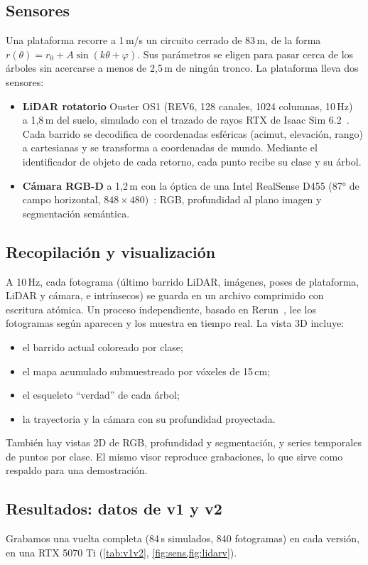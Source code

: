 \documentclass[11pt,a4paper]{article}
\begin{document}
\subsection{Sensores}
Una plataforma recorre a 1\,m/s un circuito cerrado de 83\,m, de la forma $r(\theta) = r_0 + A\sin(k\theta+\varphi)$. Sus parámetros se eligen para pasar cerca de los árboles sin acercarse a menos de 2,5\,m de ningún tronco. La plataforma lleva dos sensores:
\begin{itemize}
  \item \textbf{LiDAR rotatorio} Ouster OS1 (REV6, 128 canales, 1024 columnas, 10\,Hz)~\cite{ousteros1} a 1,8\,m del suelo, simulado con el trazado de rayos RTX de Isaac Sim 6.2~\cite{isaacsim}. Cada barrido se decodifica de coordenadas esféricas (acimut, elevación, rango) a cartesianas y se transforma a coordenadas de mundo. Mediante el identificador de objeto de cada retorno, cada punto recibe su clase y su árbol.
  \item \textbf{Cámara RGB-D} a 1,2\,m con la óptica de una Intel RealSense D455 (87° de campo horizontal, $848\times480$)~\cite{realsensed455}: RGB, profundidad al plano imagen y segmentación semántica.
\end{itemize}

\subsection{Recopilación y visualización}
A 10\,Hz, cada fotograma (último barrido LiDAR, imágenes, poses de plataforma, LiDAR y cámara, e intrínsecos) se guarda en un archivo comprimido con escritura atómica. Un proceso independiente, basado en Rerun~\cite{rerun}, lee los fotogramas según aparecen y los muestra en tiempo real. La vista 3D incluye:
\begin{itemize}
  \item el barrido actual coloreado por clase;
  \item el mapa acumulado submuestreado por vóxeles de 15\,cm;
  \item el esqueleto \enquote{verdad} de cada árbol;
  \item la trayectoria y la cámara con su profundidad proyectada.
\end{itemize}
También hay vistas 2D de RGB, profundidad y segmentación, y series temporales de puntos por clase. El mismo visor reproduce grabaciones, lo que sirve como respaldo para una demostración.

\subsection{Resultados: datos de v1 y v2}
Grabamos una vuelta completa (84\,s simulados, 840 fotogramas) en cada versión, en una RTX 5070 Ti (\cref{tab:v1v2}, \cref{fig:sens,fig:lidarv}).
\end{document}
